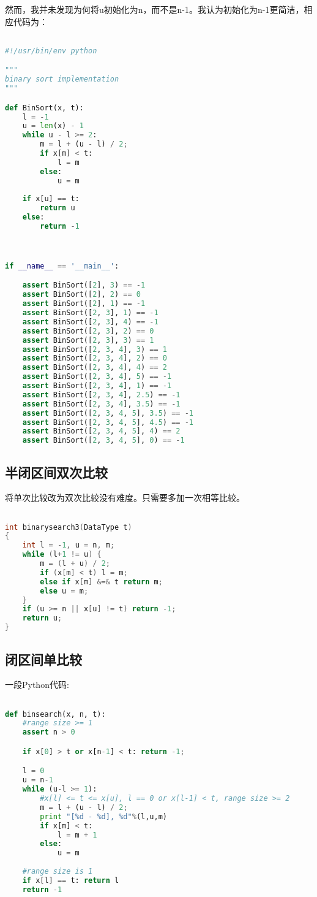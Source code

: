 然而，我并未发现为何将u初始化为n，而不是n-1。我认为初始化为n-1更简洁，相应代码为：
\begin{lstlisting}[language=Python]

#!/usr/bin/env python

"""
binary sort implementation
"""

def BinSort(x, t):
    l = -1
    u = len(x) - 1
    while u - l >= 2:
        m = l + (u - l) / 2;
        if x[m] < t:
            l = m
        else:
            u = m
    
    if x[u] == t:
        return u
    else: 
        return -1



if __name__ == '__main__':

    assert BinSort([2], 3) == -1
    assert BinSort([2], 2) == 0
    assert BinSort([2], 1) == -1
    assert BinSort([2, 3], 1) == -1
    assert BinSort([2, 3], 4) == -1
    assert BinSort([2, 3], 2) == 0
    assert BinSort([2, 3], 3) == 1
    assert BinSort([2, 3, 4], 3) == 1
    assert BinSort([2, 3, 4], 2) == 0
    assert BinSort([2, 3, 4], 4) == 2
    assert BinSort([2, 3, 4], 5) == -1
    assert BinSort([2, 3, 4], 1) == -1
    assert BinSort([2, 3, 4], 2.5) == -1
    assert BinSort([2, 3, 4], 3.5) == -1
    assert BinSort([2, 3, 4, 5], 3.5) == -1
    assert BinSort([2, 3, 4, 5], 4.5) == -1
    assert BinSort([2, 3, 4, 5], 4) == 2
    assert BinSort([2, 3, 4, 5], 0) == -1

\end{lstlisting}

\subsection{半闭区间双次比较}
将单次比较改为双次比较没有难度。只需要多加一次相等比较。

\begin{lstlisting}[language=C]

int binarysearch3(DataType t)
{	
	int l = -1, u = n, m;
	while (l+1 != u) {
		m = (l + u) / 2;
		if (x[m] < t) l = m;
		else if x[m] &=& t return m;
		else u = m;
	}
	if (u >= n || x[u] != t) return -1;
	return u;
}
\end{lstlisting}

\subsection{闭区间单比较}
\cite{self}一段Python代码:
\begin{lstlisting}[language=Python]

def binsearch(x, n, t):
    #range size >= 1
    assert n > 0

    if x[0] > t or x[n-1] < t: return -1;

    l = 0
    u = n-1
    while (u-l >= 1): 
        #x[l] <= t <= x[u], l == 0 or x[l-1] < t, range size >= 2
        m = l + (u - l) / 2;
        print "[%d - %d], %d"%(l,u,m)
        if x[m] < t: 
            l = m + 1
        else: 
            u = m
    
    #range size is 1 
    if x[l] == t: return l
    return -1

\end{lstlisting}

